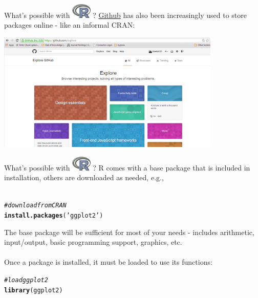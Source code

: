 \documentclass[xcolor=svgnames]{beamer}\usepackage[]{graphicx}\usepackage[]{color}
\makeatletter
\newcommand{\hlstr}[1]{\textcolor[rgb]{0.192,0.494,0.8}{#1}}%
\newcommand{\hlcom}[1]{\textcolor[rgb]{0.678,0.584,0.686}{\textit{#1}}}%
\newcommand{\hlstd}[1]{\textcolor[rgb]{0.345,0.345,0.345}{#1}}%
\newcommand{\hlkwd}[1]{\textcolor[rgb]{0.737,0.353,0.396}{\textbf{#1}}}%
\newenvironment{kframe}{%
 \def\at@end@of@kframe{}%
 \ifinner\ifhmode%
  \def\at@end@of@kframe{\end{minipage}}%
  \begin{minipage}{\columnwidth}%
 \fi\fi%
 \def\FrameCommand##1{\hskip\@totalleftmargin \hskip-\fboxsep
 \colorbox{shadecolor}{##1}\hskip-\fboxsep
     \hskip-\linewidth \hskip-\@totalleftmargin \hskip\columnwidth}%
 \MakeFramed {\advance\hsize-\width
   \@totalleftmargin\z@ \linewidth\hsize
   \@setminipage}}%
 {\par\unskip\endMakeFramed%
 \at@end@of@kframe}
\newenvironment{knitrout}{}{} %
\makeatother
\begin{document}
\begin{frame}[t]{What's possible with \includegraphics[width=0.07\textwidth]{Rlogo.jpg} \hspace{0.2em}? }
\href{https://github.com/}{Github} has also been increasingly used to store packages online  - like an informal CRAN:
\begin{center}
\includegraphics[width = 0.8\textwidth]{git.png}
\end{center}
\end{frame}

\begin{frame}[t,fragile]{What's possible with \includegraphics[width=0.07\textwidth]{Rlogo.jpg} \hspace{0.2em}? }
R comes with a base package that is included in installation, others are downloaded as needed, e.g.,\\~\\
\begin{knitrout}\scriptsize
{}\color{fgcolor}\begin{kframe}
\begin{alltt}
\hlcom{# download from CRAN}
\hlkwd{install.packages}\hlstd{(}\hlstr{'ggplot2'}\hlstd{)}
\end{alltt}
\end{kframe}
\end{knitrout}
\vspace{0.2in}
The base package will be sufficient for most of your needs - includes arithmetic, input/output, basic programming support, graphics, etc.\\~\\
Once a package is installed, it must be loaded to use its functions:
\begin{knitrout}\scriptsize
{}\color{fgcolor}\begin{kframe}
\begin{alltt}
\hlcom{# load ggplot2}
\hlkwd{library}\hlstd{(ggplot2)}
\end{alltt}
\end{kframe}
\end{knitrout}
\end{frame}
\end{document}
